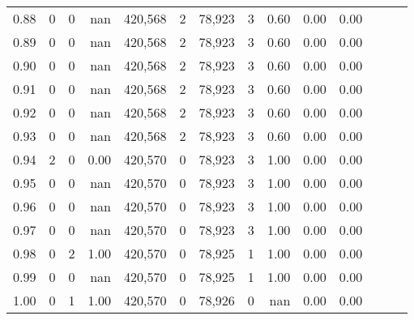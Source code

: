\begin{tabular}{rrrrrrrrrrrrrr}
0.88 &       0 &       0 &   nan &  420,568 &        2 &  78,923 &       3 &  0.60 &  0.00 &      0.00 \\
0.89 &       0 &       0 &   nan &  420,568 &        2 &  78,923 &       3 &  0.60 &  0.00 &      0.00 \\
0.90 &       0 &       0 &   nan &  420,568 &        2 &  78,923 &       3 &  0.60 &  0.00 &      0.00 \\
0.91 &       0 &       0 &   nan &  420,568 &        2 &  78,923 &       3 &  0.60 &  0.00 &      0.00 \\
0.92 &       0 &       0 &   nan &  420,568 &        2 &  78,923 &       3 &  0.60 &  0.00 &      0.00 \\
0.93 &       0 &       0 &   nan &  420,568 &        2 &  78,923 &       3 &  0.60 &  0.00 &      0.00 \\
0.94 &       2 &       0 &  0.00 &  420,570 &        0 &  78,923 &       3 &  1.00 &  0.00 &      0.00 \\
0.95 &       0 &       0 &   nan &  420,570 &        0 &  78,923 &       3 &  1.00 &  0.00 &      0.00 \\
0.96 &       0 &       0 &   nan &  420,570 &        0 &  78,923 &       3 &  1.00 &  0.00 &      0.00 \\
0.97 &       0 &       0 &   nan &  420,570 &        0 &  78,923 &       3 &  1.00 &  0.00 &      0.00 \\
0.98 &       0 &       2 &  1.00 &  420,570 &        0 &  78,925 &       1 &  1.00 &  0.00 &      0.00 \\
0.99 &       0 &       0 &   nan &  420,570 &        0 &  78,925 &       1 &  1.00 &  0.00 &      0.00 \\
1.00 &       0 &       1 &  1.00 &  420,570 &        0 &  78,926 &       0 &   nan &  0.00 &      0.00 \\
\bottomrule
\end{tabular}
